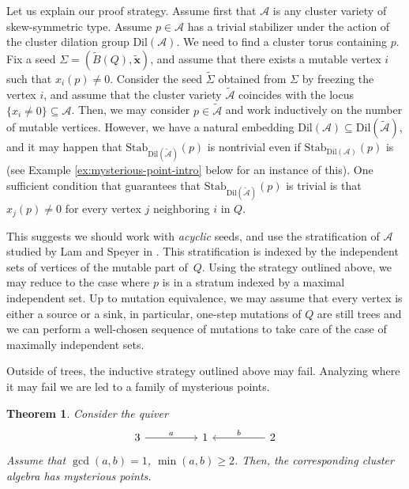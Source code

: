 \documentclass{amsart}
\newcommand{\seed}{\Sigma}
\newcommand{\excluster}[1]{\widetilde{\mathbf{#1}}}
\newcommand{\exmatrix}[1]{\widetilde{#1}}
\newcommand{\var}{\mathcal{A}}
\newcommand{\Stab}{\mathrm{Stab}}
\numberwithin{equation}{section}
\newtheorem{theorem}{Theorem}[section]
\theoremstyle{definition}
\newcommand{\dil}{\mathrm{Dil}}
\newcommand{\cS}[1]{\textcolor{purple}{[SN: \footnotesize $\blacksquare$ #1 $\blacksquare$]}}
\begin{document}
Let us explain our proof strategy. Assume first that $\var$ is any cluster variety of skew-symmetric type. Assume $p \in \var$ has a trivial stabilizer under the action of the cluster dilation group $\dil(\var)$. We need to find a cluster torus containing $p$. Fix a seed $\seed = (\exmatrix{B}(Q), \excluster{x})$, and assume that there exists a mutable vertex $i$ such that $x_i(p) \neq 0$. Consider the seed $\widetilde{\seed}$ obtained from $\seed$ by freezing the vertex $i$, and assume that the cluster variety $\widetilde{\var}$ coincides with the locus $\{x_i \neq 0\} \subseteq \var$. Then, we may consider $p \in \widetilde{\var}$ and work inductively on the number of mutable vertices. However, we have a natural embedding $\dil(\var) \subseteq \dil(\widetilde{\var})$, and it may happen that $\Stab_{\dil(\widetilde{\var})}(p)$ is nontrivial even if $\Stab_{\dil(\var)}(p)$ is (see Example \ref{ex:mysterious-point-intro} below for an instance of this). One sufficient condition that guarantees that $\Stab_{\dil(\widetilde{\var})}(p)$ is trivial is that $x_j(p) \neq 0$ for every vertex $j$ neighboring $i$ in $Q$. 

This suggests we should work with \emph{acyclic} seeds, and use the stratification of $\var$ studied by Lam and Speyer in \cite{LSII}. 
This stratification is indexed by the independent sets of vertices of the mutable part of~$Q$.
Using the strategy outlined above, we may reduce to the case where $p$ is in a stratum indexed by a maximal independent set.
Up to mutation equivalence, we may assume that every vertex is either a source or a sink, in particular, one-step mutations of $Q$ are still trees and we can perform a well-chosen sequence of mutations to take care of the case of maximally independent sets.

Outside of trees, the inductive strategy outlined above  may fail. Analyzing where it may fail we are led to a family of mysterious points.

\begin{theorem}\label{thm:main2-intro}
Consider the quiver
\[\begin{tikzcd}
	3 && 1 && 2
	\arrow["a", from=1-1, to=1-3] %
	\arrow["b"', from=1-5, to=1-3] %
\end{tikzcd}\]
Assume that $\gcd(a,b)=1$, $\min(a,b) \geq 2$. Then, the corresponding cluster algebra has mysterious points. 
\end{theorem}
\end{document}
